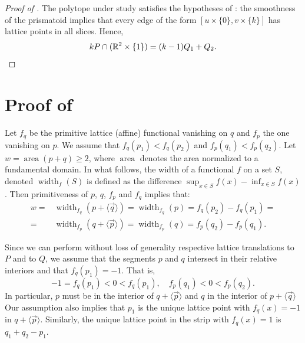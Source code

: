 \documentclass{amsart}
\theoremstyle{plain}
\theoremstyle{definition}
\newcommand{\R}{ \ensuremath{\mathbb{R}}}
\newcommand{\width}{\operatorname{width}}
\newcommand{\area}{\operatorname{area}}
\renewcommand{\vec}[1]{\overrightarrow#1}
\newcommand{\vecline}[1]{\langle \vec #1 \rangle}
\begin{document}
\begin{proof}[Proof of ]
The polytope under study satisfies the hypotheses of : %
the smoothness of the prismatoid implies that every edge of the form $[u\times \{0\}, v\times \{k\}]$ has lattice points in all slices. 
Hence,
\[
kP \cap(\R^2\times\{1\}) = (k-1)Q_1 + Q_2.
\qedhere
\] 
\end{proof}




\section{Proof of }
\label{sec:the_lemma}

Let $f_q$ be the primitive lattice (affine) functional vanishing on $q$ and $f_p$ the one vanishing on $p$. We assume that $f_q(p_1) < f_q(p_2)$ and $f_p(q_1) < f_p(q_2)$.
Let $w=\area(p+q) \geq 2$, where $\area$ denotes the area normalized to a fundamental domain. In what follows, the width of a functional $f$ on a set $S$, denoted $\width_f(S)$ is defined as the difference $\sup_{x\in S} f(x)-\inf_{x\in S} f(x)$.
Then primitiveness of $p$, $q$, $f_p$ and $f_q$ implies that:
\begin{align*}
w=&\width_{f_q}(p + \vecline q )=\width_{f_q}(p) = f_q(p_2) - f_q(p_1) =\\
=&\width_{f_p}(q +\vecline p ) = \width_{f_p}(q)= f_p(q_2) - f_p(q_1).
\end{align*}





%
Since we can perform without loss of generality respective lattice translations to $P$ and to $Q$, we assume that the segments $p$ and $q$ intersect in their relative interiors and that $f_q(p_1)=-1$. That is,
\[
-1=f_q(p_1) < 0 < f_q(p_1), \quad
f_p(q_1) < 0 < f_p(q_2).
\]
In particular, $p$ must be in the interior of $q +\vecline p$ and $q$ in the interior of $p +\vecline q$
Our assumption also implies that $p_1$ is the unique lattice point with $f_q(x)=-1$ in $q +\vecline p$. Similarly, the unique lattice point in the strip with $f_q(x)=1$ is  $q_1+q_2 -p_1$.
\end{document}
